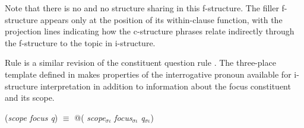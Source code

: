 \documentclass[output=paper,hidelinks]{langscibook}
\begin{document}
\noindent Note that there is no  and no structure sharing in this f-structure.  The filler f-structure appears only at the position of its within-clause function, with the projection lines indicating how the c-structure phrases relate indirectly through the f-structure to the topic in i-structure. 

Rule  is a similar revision of the constituent question rule . The three-place template  defined in  makes properties of the interrogative pronoun available for i-structure interpretation in addition to information about the focus constituent and its scope.  

\ea
\ea \label{whpathi}
\ex\label{fucustemplate}
 (\textit{scope focus q}) $\equiv$ {\small @}( \textit{scope}$_{\sigma\iota}$
                                                                                                         \textit{focus}$_{\sigma\iota}$
                                                                                                         \textit{q}$_{\sigma\iota}$)
\z\z
\end{document}
